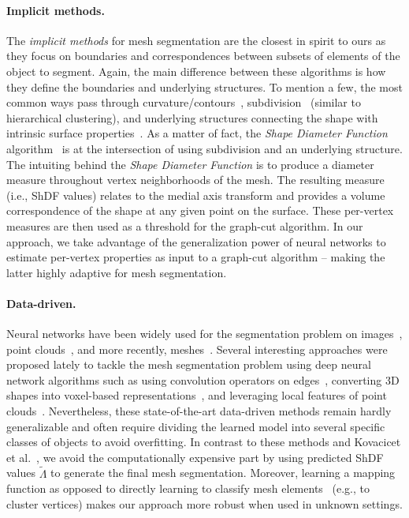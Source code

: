 \paragraph{\textbf{Implicit methods.}}
The \textit{implicit methods} for mesh segmentation are the closest in spirit to ours as they focus on boundaries and correspondences between subsets of elements of the object to segment. Again, the main difference between these algorithms is how they define the boundaries and underlying structures. To mention a few, the most common ways pass through curvature/contours~\cite{lee2005mesh, levy2002least, mitani2004making}, subdivision~\cite{katz2003hierarchical, podolak2006planar} (similar to hierarchical clustering), and underlying structures connecting the shape with intrinsic surface properties~\cite{li2001decomposing, raab2004virtual, lien2006simultaneous}. As a matter of fact, the \textit{Shape Diameter Function} algorithm~\cite{shapira2008consistent} is at the intersection of using subdivision and an underlying structure. The intuiting behind the \textit{Shape Diameter Function} is to produce a diameter measure throughout vertex neighborhoods of the mesh. The resulting measure (i.e., ShDF values) relates to the medial axis transform and provides a volume correspondence of the shape at any given point on the surface. These per-vertex measures are then used as a threshold for the graph-cut algorithm. In our approach, we take advantage of the generalization power of neural networks to estimate per-vertex properties as input to a graph-cut algorithm -- making the latter highly adaptive for mesh segmentation.
\paragraph{\textbf{Data-driven.}}
Neural networks have been widely used for the segmentation problem on images~\cite{lai2015deep}, point clouds~\cite{qi2017pointnet}, and more recently, meshes~\cite{hanocka2019meshcnn}. Several interesting approaches were proposed lately to tackle the mesh segmentation problem using deep neural network algorithms such as using convolution operators on edges~\cite{hanocka2019meshcnn}, converting 3D shapes into voxel-based representations~\cite{wu20153d, wang2017cnn, graham20183d}, and leveraging local features of point clouds~\cite{qi2017pointnet, qi2017pointnet++}. Nevertheless, these state-of-the-art data-driven methods remain hardly generalizable and often require dividing the learned model into several specific classes of objects to avoid overfitting. In contrast to these methods and Kovacicet et al.~\cite{kovacic2010fast}, we avoid the computationally expensive part by using predicted ShDF values $\tilde{\Lambda}$ to generate the final mesh segmentation. Moreover, learning a mapping function as opposed to directly learning to classify mesh elements~\cite{kalogerakis2010learning} (e.g., to cluster vertices) makes our approach more robust when used in unknown settings.

